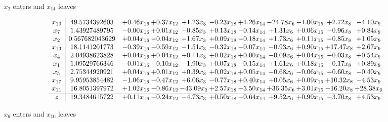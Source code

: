 \documentclass[9pt]{article}
\begin{document}
 $ x_{2} $ enters and $ x_{14} $ leaves 

 \[\begin{array}{c| c c@{\hskip 2pt} c@{\hskip 2pt} c@{\hskip 2pt} c@{\hskip 2pt} c@{\hskip 2pt} c@{\hskip 2pt} c@{\hskip 2pt} c@{\hskip 2pt} c@{\hskip 2pt} }
 x_{10}   &  49.5734392603 & +  0.46 x_{16} & +  0.37 x_{12} & +  1.23 x_{3} & -0.23 x_{18} & +  1.26 x_{14} & -24.78 x_{6} & -1.00 x_{15} & +  2.72 x_{8} & -4.10 x_{9}\\
 x_{7}   &  1.43927489795 & -0.00 x_{16} & +  0.01 x_{12} & -0.85 x_{3} & +  0.13 x_{18} & -0.14 x_{14} & +  1.31 x_{6} & +  0.06 x_{15} & -0.96 x_{8} & +  0.84 x_{9}\\
 x_{2}   &  0.567682043629 & +  0.04 x_{16} & -0.04 x_{12} & -1.67 x_{3} & +  0.09 x_{18} & -0.18 x_{14} & +  1.73 x_{6} & +  0.11 x_{15} & -0.85 x_{8} & +  1.05 x_{9}\\
 x_{13}   &  18.1141201773 & -0.39 x_{16} & -0.59 x_{12} & -1.51 x_{3} & -0.32 x_{18} & -0.07 x_{14} & -0.93 x_{6} & +  0.90 x_{15} & + 17.47 x_{8} & +  2.67 x_{9}\\
 x_{4}   &  2.04938623828 & +  0.04 x_{16} & +  0.04 x_{12} & +  0.11 x_{3} & +  0.02 x_{18} & +  0.00 x_{14} & -0.09 x_{6} & +  0.04 x_{15} & -0.03 x_{8} & +  0.54 x_{9}\\
 x_{1}   &  1.09529766346 & -0.01 x_{16} & -0.10 x_{12} & -1.90 x_{3} & +  0.07 x_{18} & -0.15 x_{14} & +  1.61 x_{6} & +  0.18 x_{15} & -0.17 x_{8} & +  0.89 x_{9}\\
 x_{5}   &  2.75344920921 & +  0.04 x_{16} & +  0.01 x_{12} & +  0.39 x_{3} & +  0.02 x_{18} & +  0.05 x_{14} & -0.68 x_{6} & -0.06 x_{15} & -0.60 x_{8} & -0.40 x_{9}\\
 x_{17}   &  9.95953854482 & -1.06 x_{16} & -0.47 x_{12} & +  6.06 x_{3} & -0.77 x_{18} & +  0.40 x_{14} & +  0.05 x_{6} & +  0.09 x_{15} & + 10.32 x_{8} & -4.53 x_{9}\\
 x_{11}   &  16.8051397972 & +  1.02 x_{16} & -0.86 x_{12} & -43.09 x_{3} & +  2.57 x_{18} & -3.50 x_{14} & + 36.35 x_{6} & +  3.01 x_{15} & -16.20 x_{8} & + 28.38 x_{9}\\
\hline
z    &  19.3484615722 & +  0.11 x_{16} & -0.24 x_{12} & -4.73 x_{3} & +  0.50 x_{18} & -0.64 x_{14} & +  9.52 x_{6} & +  0.99 x_{15} & -3.70 x_{8} & +  4.53 x_{9}\\
\end{array}\]


 $ x_{6} $ enters and $ x_{10} $ leaves 
\end{document}
